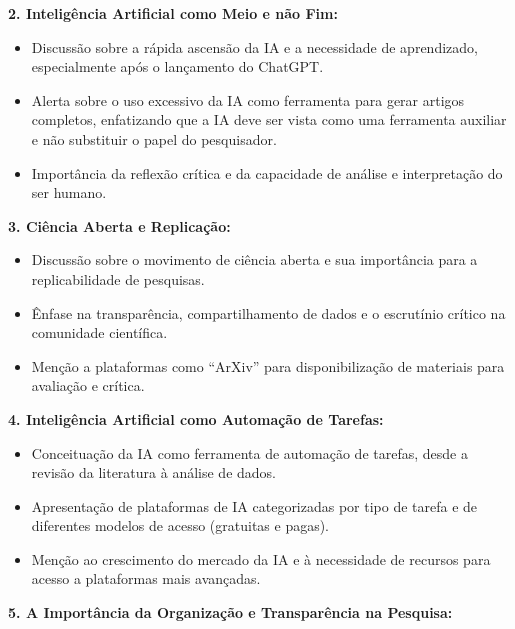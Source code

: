 \documentclass[
  a4paper,
]{book}
\providecommand{\tightlist}{%
  \setlength{\itemsep}{0pt}\setlength{\parskip}{0pt}}\usepackage{longtable,booktabs,array}
\begin{document}
\begin{tcolorbox}
\textbf{2. Inteligência Artificial como Meio e não Fim:}\vspace{0.5em}

\begin{itemize}
\tightlist
\item
  Discussão sobre a rápida ascensão da IA e a necessidade de
  aprendizado, especialmente após o lançamento do ChatGPT.
\item
  Alerta sobre o uso excessivo da IA como ferramenta para gerar artigos
  completos, enfatizando que a IA deve ser vista como uma ferramenta
  auxiliar e não substituir o papel do pesquisador.
\item
  Importância da reflexão crítica e da capacidade de análise e
  interpretação do ser humano.\vspace{0.5em}
\end{itemize}

\textbf{3. Ciência Aberta e Replicação:}\vspace{0.5em}

\begin{itemize}
\tightlist
\item
  Discussão sobre o movimento de ciência aberta e sua importância para a
  replicabilidade de pesquisas.
\item
  Ênfase na transparência, compartilhamento de dados e o escrutínio
  crítico na comunidade científica.
\item
  Menção a plataformas como ``ArXiv'' para disponibilização de materiais
  para avaliação e crítica.\vspace{0.5em}
\end{itemize}

\textbf{4. Inteligência Artificial como Automação de
Tarefas:}\vspace{0.5em}

\begin{itemize}
\tightlist
\item
  Conceituação da IA como ferramenta de automação de tarefas, desde a
  revisão da literatura à análise de dados.
\item
  Apresentação de plataformas de IA categorizadas por tipo de tarefa e
  de diferentes modelos de acesso (gratuitas e pagas).
\item
  Menção ao crescimento do mercado da IA e à necessidade de recursos
  para acesso a plataformas mais avançadas.\vspace{0.5em}
\end{itemize}

\textbf{5. A Importância da Organização e Transparência na
Pesquisa:}\vspace{0.5em}


\end{tcolorbox}
\end{document}
